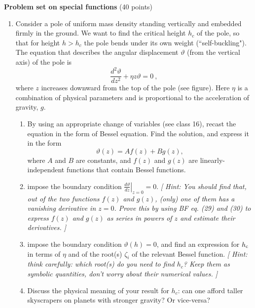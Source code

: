 \documentclass[fleqn]{article}
\newcommand{\yd}[2]{\ensuremath{\frac{d #1}{d #2}}}
\newcommand{\ydd}[2]{\ensuremath{\frac{d^{2} #1}{d {#2}^{2}}}}
\begin{document}
  \textbf{Problem set on special functions} (40 points)
  \begin{enumerate}
    \item Consider a pole of uniform mass density standing vertically and embedded firmly in the ground. 
    We want to find the critical height $h_c$ of the pole, so that for height $h > h_c$  the pole bends 
    under its own weight (``self-buckling"). The equation that describes the angular displacement $\vartheta$ (from the vertical axis) of the pole is
    \begin{equation}
      \ydd{\vartheta}{z} + \eta  z \vartheta = 0~,
    \end{equation}
    where $z$ increases downward from the top of the pole (see figure). Here $\eta$ is a combination of physical parameters and is proportional to the acceleration of gravity, $g$. 
    
    \begin{enumerate}
      \item  By using an appropriate change of variables (see class 16), recast the equation in the form of Bessel equation. Find the solution, and express it in the form
      \[
      \vartheta(z) = Af(z) + Bg(z),
      \]
      where $A$ and $B$ are constants, and $f(z)$ and $g(z)$ are linearly-independent functions that contain Bessel functions.
      
      \item impose the boundary condition $\left.\yd{\vartheta}{z}\right|_{z=0} = 0$. {\it [ Hint:  You should find that, 
      out of the two functions $f(z)$ and $g(z)$, (only) one of them has a vanishing derivative in $z=0$.  
      Prove this by using BF eq. (29) and (30) to express $f(z)$ and $g(z)$ as series in powers of $z$ and estimate their derivatives. ]}
      
      \item impose the boundary condition $\vartheta(h)=0$, and find an expression for $h_{\rm c}$ in terms of $\eta$ and of the root(s) $\zeta_i$ of the relevant Bessel function. {\it [ Hint: think carefully: which root(s) do you need to find $h_c$? Keep them as symbolic quantities, don't worry about their numerical values. ]}
      
      \item Discuss the physical meaning of your result for $h_c$: can one afford taller skyscrapers on planets with stronger gravity?  Or vice-versa? 
      
    \end{enumerate}
    

\end{enumerate}
\end{document}
